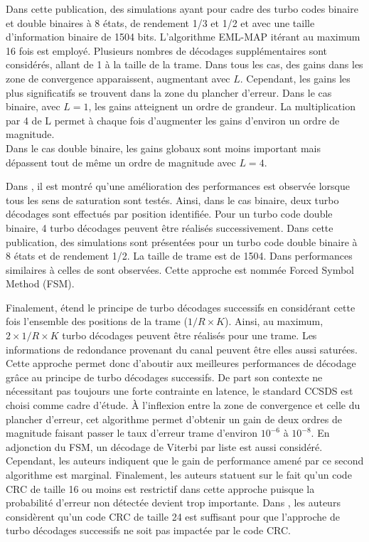 Dans cette publication, des simulations ayant pour cadre des turbo codes binaire et double binaires à 8 états, de 
rendement 1/3 et 1/2 et avec une taille d'information binaire de 1504 bits. L'algorithme EML-MAP itérant au maximum 16 fois est
employé. Plusieurs nombres de décodages supplémentaires sont considérés, allant de 1 à la taille de la trame. Dans tous 
les cas, des gains dans les zone de convergence apparaissent, augmentant avec $L$. Cependant, les gains les plus significatifs
se trouvent dans la zone du plancher d'erreur. Dans le cas binaire, avec $L=1$, les gains atteignent un ordre de grandeur. 
La multiplication par 4 de L permet à chaque fois d'augmenter les gains d'environ un ordre de magnitude.\\
Dans le cas double binaire, les gains globaux sont moins important mais dépassent tout de même un ordre de magnitude 
avec $L=4$. 

Dans \cite{fsm}, il est montré qu'une amélioration des performances est observée lorsque tous les sens de 
saturation sont testés. Ainsi, dans le cas binaire, deux turbo décodages sont effectués par position identifiée. Pour 
un turbo code double binaire, 4 turbo décodages peuvent être réalisés successivement. Dans cette publication, des 
simulations sont présentées pour un turbo code double binaire à 8 états et de rendement 1/2. La taille de trame est 
de 1504. Dans performances similaires à celles de \cite{cim} sont observées. Cette approche est nommée
Forced Symbol Method (FSM).

Finalement, \cite{pflet} étend le principe de turbo décodages successifs en considérant cette fois l'ensemble des positions de la trame ($1/R\times K$). 
Ainsi, au maximum, $2\times 1/R\times K$ turbo décodages peuvent être réalisés pour une trame. Les informations
de redondance provenant du canal peuvent être elles aussi saturées. Cette approche permet donc d'aboutir aux meilleures
performances de décodage grâce au principe de turbo décodages successifs. De part son contexte ne nécessitant pas toujours 
une forte contrainte en latence, le standard CCSDS est choisi comme cadre d'étude. À l'inflexion entre la zone de convergence 
et celle du plancher d'erreur, cet algorithme permet d'obtenir un 
gain de deux ordres de magnitude faisant passer le taux d'erreur trame d'environ $10^{-6}$ à $10^{-8}$. En adjonction du 
FSM, un décodage de Viterbi par liste est aussi considéré. Cependant, les auteurs indiquent que 
le gain de performance amené par ce second algorithme est marginal. Finalement, les auteurs statuent sur 
le fait qu'un code CRC de taille 16 ou moins est restrictif dans cette approche puisque la probabilité d'erreur non 
détectée devient trop importante. Dans \cite{fsm}, les auteurs considèrent qu'un code CRC de taille 24 est suffisant pour 
que l'approche de turbo décodages successifs ne soit pas impactée par le code CRC.

